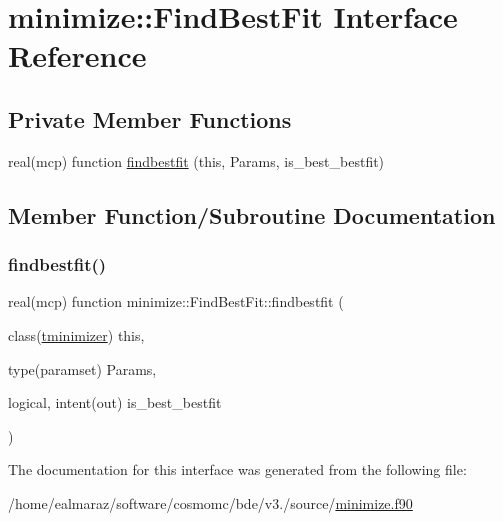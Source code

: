\hypertarget{interfaceminimize_1_1FindBestFit}{}\section{minimize\+:\+:Find\+Best\+Fit Interface Reference}
\label{interfaceminimize_1_1FindBestFit}
\subsection*{Private Member Functions}
\begin{DoxyCompactItemize}
\item 
real(mcp) function \mbox{\hyperlink{interfaceminimize_1_1FindBestFit_ab70b8d30767cb8f36ee62ec0d55b3272}{findbestfit}} (this, Params, is\+\_\+best\+\_\+bestfit)
\end{DoxyCompactItemize}


\subsection{Member Function/\+Subroutine Documentation}
\mbox{\label{interfaceminimize_1_1FindBestFit_ab70b8d30767cb8f36ee62ec0d55b3272}} 
\subsubsection{\texorpdfstring{findbestfit()}{findbestfit()}}
{\footnotesize\ttfamily real(mcp) function minimize\+::\+Find\+Best\+Fit\+::findbestfit (\begin{DoxyParamCaption}\item[{class(\mbox{\hyperlink{structminimize_1_1tminimizer}{tminimizer}})}]{this,  }\item[{type(paramset)}]{Params,  }\item[{logical, intent(out)}]{is\+\_\+best\+\_\+bestfit }\end{DoxyParamCaption})\hspace{0.3cm}{\ttfamily [private]}}



The documentation for this interface was generated from the following file\+:\begin{DoxyCompactItemize}
\item 
/home/ealmaraz/software/cosmomc/bde/v3./source/\mbox{\hyperlink{minimize_8f90}{minimize.\+f90}}\end{DoxyCompactItemize}
